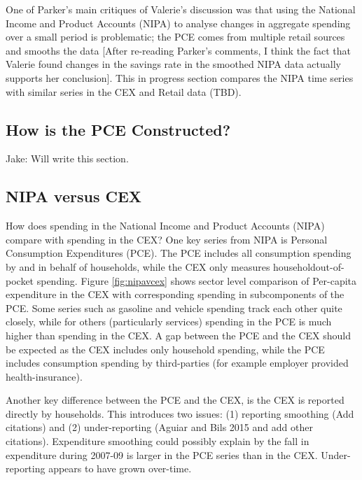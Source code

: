 

One of Parker's main critiques of Valerie's discussion was that using the National Income and Product Accounts (NIPA)
 to analyse changes in aggregate spending over a small period is problematic; the PCE comes from multiple 
 retail sources and smooths the data [After re-reading Parker's comments, I think the fact that Valerie found 
 changes in the savings rate in the smoothed NIPA data actually supports her conclusion]. 
This in progress section compares the NIPA time series with similar series in the CEX and Retail data (TBD). 


\subsection{How is the PCE Constructed?}

Jake: Will write this section. 


\subsection{NIPA versus CEX}





How does spending in the National Income and Product Accounts (NIPA) compare with spending in the CEX? One key series from 
NIPA is Personal Consumption Expenditures (PCE). The PCE includes all consumption spending by and in behalf of households,
 while the CEX only measures householdout-of-pocket spending. Figure \ref{fig:nipavcex} shows sector level comparison 
 of Per-capita expenditure in the CEX with corresponding spending in subcomponents of the PCE. 
 Some series such as gasoline and vehicle spending track each other quite closely, while for others 
 (particularly services) spending in the PCE is much higher than spending in the CEX. A gap between the PCE and the 
 CEX should be expected as the CEX includes only household spending, while the PCE includes consumption spending by 
 third-parties (for example employer provided health-insurance). 

Another key difference between the PCE and the CEX, is the CEX is reported directly by households. This introduces two 
issues: (1) reporting smoothing (Add citations) and (2) under-reporting (Aguiar and Bils 2015 and add other citations). Expenditure smoothing
could possibly explain by the fall in expenditure during 2007-09 is larger in the PCE series than in the CEX. Under-reporting appears to 
have grown over-time. 


